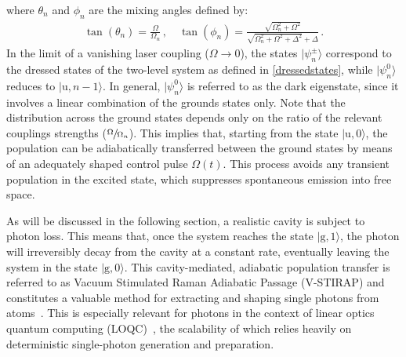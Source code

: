 \documentclass[../Thesis-IJspeert.tex]{subfiles}
\begin{document}
where $\theta_n$ and $\phi_n$ are the mixing angles defined by:
\begin{align}
\tan(\theta_n)=\frac{\Omega}{\Omega_n}\,,\quad
\tan(\phi_n) = \frac{\sqrt{\Omega_n^2 + \Omega^2}}{\sqrt{\Omega_n^2 + \Omega^2 + \Delta^2} + \Delta}\,. 
\label{eq:3lvlTripletStatesMixingAngles}
\end{align}
In the limit of a vanishing laser coupling ($\Omega\rightarrow 0 $), the states $\vert \psi ^\pm _n \rangle $ correspond to the dressed states of the two-level system as defined in \autoref{dressedstates}, while $\vert \psi ^0 _n \rangle $ reduces to $ \vert \mathrm{u}, n-1\rangle$. In general, $\vert \psi ^0 _n \rangle$ is referred to as the dark eigenstate, since it involves a linear combination of the grounds states only. Note that the distribution across the ground states depends only on the ratio of the relevant couplings strengths ($\sfrac{\Omega}{\Omega_n}$). This implies that, starting from the state $\vert \mathrm{u}, 0\rangle$, the population can be adiabatically transferred between the ground states by means of an adequately shaped control pulse $\Omega(t)$. This process avoids any transient population in the excited state, which suppresses spontaneous emission into free space.

As will be discussed in the following section, a realistic cavity is subject to photon loss. This means that, once the system reaches the state $ \vert \mathrm{g}, 1\rangle $, the photon will irreversibly decay from the cavity at a constant rate, eventually leaving the system in the state $ \vert \mathrm{g}, 0\rangle$. This cavity-mediated, adiabatic population transfer is referred to as Vacuum Stimulated Raman Adiabatic Passage (V-STIRAP) and constitutes a valuable method for extracting and shaping single photons from atoms~\cite{Kuhn2002,McKeever2004,Brattke2001}. This is especially relevant for photons in the context of linear optics quantum computing (LOQC)~\cite{Knill2001,Ralph2001,Kok2007,OBrien2007}, the scalability of which relies heavily on deterministic single-photon generation and preparation.
\end{document}
